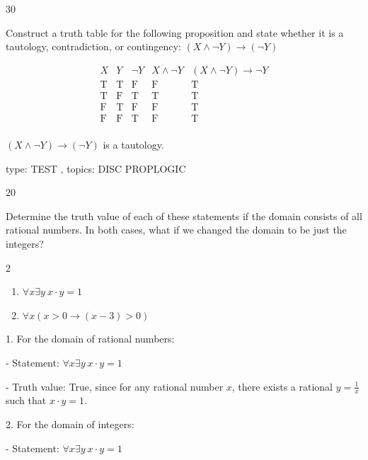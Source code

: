 \documentclass[12pt]{article}
\begin{document}
\begin{enumerate}
 \ex
{}{30}
{ 
 Construct a truth table for the following proposition and state whether it is a tautology, contradiction, or contingency:
$(X \land \neg Y) \rightarrow (\neg Y)$


}{

 

\[
\begin{array}{c|c|c|c|c}
X & Y & \neg Y & X \land \neg Y & (X \land \neg Y) \rightarrow \neg Y \\
\hline
\text{T} & \text{T} & \text{F} & \text{F} & \text{T} \\
\text{T} & \text{F} & \text{T} & \text{T} & \text{T} \\
\text{F} & \text{T} & \text{F} & \text{F} & \text{T} \\
\text{F} & \text{F} & \text{T} & \text{F} & \text{T} \\
\end{array}
\]

$(X \land \neg Y) \rightarrow (\neg Y)$ is a tautology.
}{}{type: TEST , topics: DISC PROPLOGIC}




 \ex
{}{20}
{  Determine the truth value of each of these statements if
the domain consists of all rational numbers.  In
both cases, what if we changed the domain to be just the integers?

\begin{multicols}{2} 
\begin{enumerate}

\item $\forall x \exists y \ x \cdot y = 1$

\item  $\forall x (x > 0 \rightarrow (x - 3) > 0 )$



\end{enumerate}
\end{multicols} 

}{

 

1. For the domain of rational numbers:

- Statement: $\forall x \exists y \ x \cdot y = 1$

- Truth value: True, since for any rational number $x$, there exists a rational $y = \frac{1}{x}$ such that $x \cdot y = 1$.

2. For the domain of integers:

- Statement: $\forall x \exists y \ x \cdot y = 1$

}
\end{enumerate}
\end{document}
